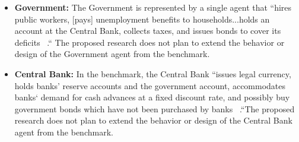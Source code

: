 \documentclass[11pt]{article}
\begin{document}
\begin{itemize}
 [grant] loans to firms, [buy] bonds issued by the Government, [are constrained by]
 capital and liquidity ratios, [and] may ask for cash advances to the Central Bank  ~\cite{Caiani-benchmark-paper}.
 The proposed research does not plan to extend the behavior or design of the bank
 agents from the benchmark.
 \item \textbf{Government:} The Government is represented by a single agent that
 ``hires public workers, [pays] unemployment benefits to households...holds an
 account at the Central Bank, collects taxes, and issues bonds to cover its deficits
  ~\cite{Caiani-benchmark-paper}.`` The proposed research does not plan to extend
   the behavior or design of the Government agent from the benchmark.
\item \textbf{Central Bank:} In the benchmark, the Central Bank ``issues legal
currency, holds banks’ reserve accounts and the government account, accommodates
banks` demand for cash advances at a fixed discount rate, and possibly buy
government bonds which have not been purchased by banks
~\cite{Caiani-benchmark-paper}.``The proposed research does not plan to
extend the behavior or design of the Central Bank agent from the benchmark.
\end{itemize}
\end{document}

